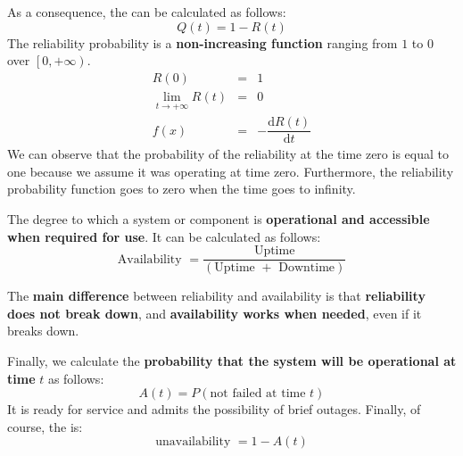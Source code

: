\highspace
As a consequence, the  can be calculated as follows:
\begin{equation}
    Q\left(t\right) = 1 - R\left(t\right)
\end{equation}
The reliability probability is a \textbf{non-increasing function} ranging from $1$ to $0$ over $\left.\left[0, +\infty\right.\right)$.
\begin{equation}
    \begin{array}{rcl}
        R\left(0\right) &=& 1 \\ [.5em]
        \lim\limits_{t \rightarrow +\infty} R\left(t\right) &=& 0 \\ [.5em]
        f\left(x\right) &=& -\dfrac{\mathrm{d}R\left(t\right)}{\mathrm{d}t}
    \end{array}
\end{equation}
We can observe that the probability of the reliability at the time zero is equal to one because we assume it was operating at time zero. Furthermore, the reliability probability function goes to zero when the time goes to infinity.

\highspace
\begin{definitionbox}[: Availability]
    The degree to which a system or component is \textbf{operational and accessible when required for use}. It can be calculated as follows:
    \begin{equation}
        \text{Availability } = \dfrac{\text{Uptime}}{\left(\text{Uptime } + \text{ Downtime}\right)}
    \end{equation}
\end{definitionbox}

\highspace
The \textbf{main difference} between reliability and availability is that \textbf{reliability does not break down}, and \textbf{availability works when needed}, even if it breaks down.

\highspace
Finally, we calculate the \textbf{probability that the system will be operational at time} $t$ as follows:
\begin{equation}
    A\left(t\right) = P\left(\text{not failed at time } t\right)
\end{equation}
It is ready for service and admits the possibility of brief outages. Finally, of course, the  is:
\begin{equation}
    \text{unavailability } = 1-A\left(t\right)
\end{equation}

